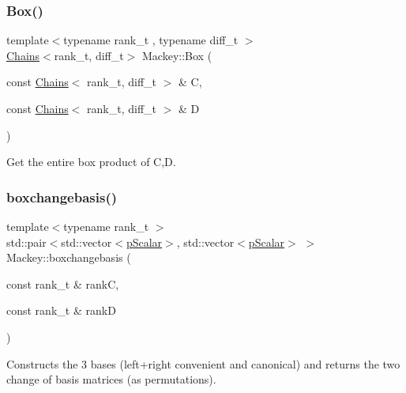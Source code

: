 \subsubsection{\texorpdfstring{Box()}{Box()}\hspace{0.1cm}{\footnotesize\ttfamily [2/2]}}
{\footnotesize\ttfamily template$<$typename rank\+\_\+t , typename diff\+\_\+t $>$ \\
\hyperlink{classMackey_1_1Chains}{Chains}$<$rank\+\_\+t, diff\+\_\+t$>$ Mackey\+::\+Box (\begin{DoxyParamCaption}\item[{const \hyperlink{classMackey_1_1Chains}{Chains}$<$ rank\+\_\+t, diff\+\_\+t $>$ \&}]{C,  }\item[{const \hyperlink{classMackey_1_1Chains}{Chains}$<$ rank\+\_\+t, diff\+\_\+t $>$ \&}]{D }\end{DoxyParamCaption})}



Get the entire box product of C,D. 

\mbox{\label{namespaceMackey_a90ea60504ffb74da3a53875368225f8f}} 
\subsubsection{\texorpdfstring{boxchangebasis()}{boxchangebasis()}}
{\footnotesize\ttfamily template$<$typename rank\+\_\+t $>$ \\
std\+::pair$<$std\+::vector$<$\hyperlink{namespaceMackey_a67b5f4650ba2f166d15133a1bea2472b}{p\+Scalar}$>$, std\+::vector$<$\hyperlink{namespaceMackey_a67b5f4650ba2f166d15133a1bea2472b}{p\+Scalar}$>$ $>$ Mackey\+::boxchangebasis (\begin{DoxyParamCaption}\item[{const rank\+\_\+t \&}]{rankC,  }\item[{const rank\+\_\+t \&}]{rankD }\end{DoxyParamCaption})}



Constructs the 3 bases (left+right convenient and canonical) and returns the two change of basis matrices (as permutations). 

